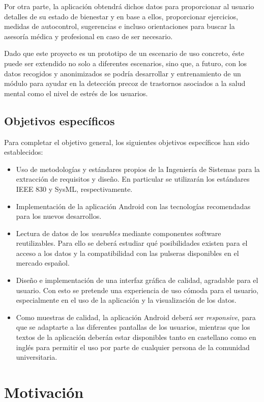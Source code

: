     Por otra parte, la aplicación obtendrá dichos datos para proporcionar al usuario detalles de su estado de bienestar y en base a ellos, proporcionar ejercicios, medidas de autocontrol, sugerencias e incluso orientaciones para buscar la asesoría médica y profesional en caso de ser necesario.

Dado que este proyecto es un prototipo de un escenario de uso concreto, éste puede ser extendido no solo a diferentes escenarios, sino que, a futuro, con los datos recogidos y anonimizados se podría
desarrollar y entrenamiento de un módulo para ayudar en la detección precoz de trastornos asociados a la salud mental como el nivel de estrés de los usuarios.

    \subsection{Objetivos específicos}
    Para completar el objetivo general, los siguientes objetivos específicos han sido establecidos:
    \begin{itemize}
        \item Uso de metodologías y estándares propios de la Ingeniería de Sistemas para la extracción de requisitos y diseño. En particular se utilizarán los estándares IEEE 830 y SysML, respectivamente.
        \item Implementación de la aplicación Android con las tecnologías recomendadas para los nuevos desarrollos. 
        \item Lectura de datos de los \textit{wearables} mediante componentes software reutilizables. Para ello se deberá estudiar qué posibilidades existen para el acceso a los datos y la compatibilidad con las pulseras disponibles en el mercado español.
        \item Diseño e implementación de una interfaz gráfica de calidad, agradable para el usuario. Con esto se pretende una experiencia de uso cómoda para el usuario, especialmente en el uso de la aplicación y la visualización de los datos. 
        \item Como muestras de calidad, la aplicación Android deberá ser \textit{responsive}, para que se adaptarte a las diferentes pantallas de los usuarios, mientras que los textos de la aplicación deberán estar disponibles tanto en castellano como en inglés para permitir el uso por parte de cualquier persona de la comunidad universitaria.
    \end{itemize}

\section{Motivación}

